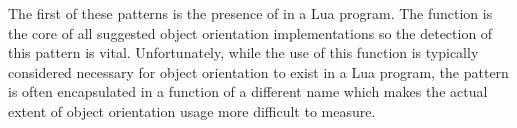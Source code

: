The first of these patterns is the presence of  in a Lua program. The  function is the core of all suggested object orientation implementations so the detection of this pattern is vital. Unfortunately, while the use of this function is typically considered necessary for object orientation to exist in a Lua program, the pattern is often encapsulated in a function of a different name which makes the actual extent of object orientation usage more difficult to measure.






